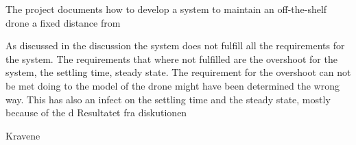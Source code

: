 The project documents how to develop a system to maintain an off-the-shelf drone a fixed distance from

As discussed in the discussion the system does not fulfill all the requirements for the system. The requirements that where not fulfilled are the overshoot for the system, the settling time, steady state. 
The requirement for the overshoot can not be met doing to the model of the drone might have been determined the wrong way. This has also an infect on the settling time and the steady state, mostly because of the d
Resultatet fra diskutionen

Kravene

